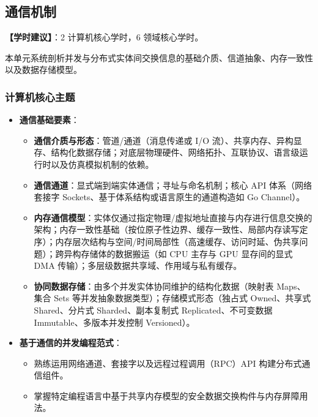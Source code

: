 \subsection{通信机制}
\textbf{【学时建议】}：2 计算机核心学时，6 领域核心学时。

本单元系统剖析并发与分布式实体间交换信息的基础介质、信道抽象、内存一致性以及数据存储模型。

\subsubsection{计算机核心主题}
\begin{itemize}
    \item \textbf{通信基础要素}：
    \begin{itemize}
        \item \textbf{通信介质与形态}：管道/通道（消息传递或 I/O 流）、共享内存、异构显存、结构化数据存储；对底层物理硬件、网络拓扑、互联协议、语言级运行时以及仿真模拟机制的依赖。
        \item \textbf{通信通道}：显式端到端实体通信；寻址与命名机制；核心 API 体系（网络套接字 Sockets、基于体系结构或语言原生的通道构造如 Go Channel）。
        \item \textbf{内存通信模型}：实体仅通过指定物理/虚拟地址直接与内存进行信息交换的架构；内存一致性基础（按位原子性边界、缓存一致性、局部内存读写定序）；内存层次结构与空间/时间局部性（高速缓存、访问时延、伪共享问题）；跨异构存储体的数据搬运（如 CPU 主存与 GPU 显存间的显式 DMA 传输）；多层级数据共享域、作用域与私有缓存。
        \item \textbf{协同数据存储}：由多个并发实体协同维护的结构化数据（映射表 Maps、集合 Sets 等并发抽象数据类型）；存储模式形态（独占式 Owned、共享式 Shared、分片式 Sharded、副本复制式 Replicated、不可变数据 Immutable、多版本并发控制 Versioned）。
    \end{itemize}
    \item \textbf{基于通信的并发编程范式}：
    \begin{itemize}
        \item 熟练运用网络通道、套接字以及远程过程调用（RPC）API 构建分布式通信组件。
        \item 掌握特定编程语言中基于共享内存模型的安全数据交换构件与内存屏障用法。
    \end{itemize}
\end{itemize}

